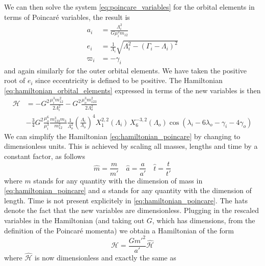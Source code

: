 \documentclass[ twoside,openright,titlepage,numbers=noenddot,headinclude,%
                footinclude=true,cleardoublepage=empty,abstractoff, %
                BCOR=5mm,paper=a4,fontsize=11pt,%
                american,%
                ]{scrreprt}
\begin{document}
We can then solve the system 
\ref{eq:poincare_variables} for the orbital elements in terms of Poincaré
variables, the result is
\begin{equation}
    \begin{aligned}
        a_i&= \frac{\Lambda_i^2}{G\mu_i^2m_{12}} \\
        e_i &= \frac{1}{\Lambda_i} \sqrt{\Lambda_i^2-(\Gamma_i-\Lambda_i)^2}\\
        \varpi_i&=-\gamma_i
    \end{aligned}
    \label{eq:orbital_elems_in_terms_of_poincare}
\end{equation}
and again similarly for the outer orbital elements. We have taken the positive root
of $e_i$ since eccentricity is defined to be positive. The Hamiltonian
\ref{eq:hamiltonian_orbital_elements} expressed in terms of the new variables
is then
\begin{equation}
    \begin{aligned}
        \mathcal{H}&=-G^2 \frac{\mu_i^3m_{12}^2}{2\Lambda_i^2}  
        -G^2 \frac{\mu_o^3m_{123}^2}{2\Lambda_o^2}\\ 
        &-\frac{3}{4}G^2 \frac{\mu_o^6}{\mu_i^3} \frac{m_{123}^3m_3}{m_{12}^2}
        \frac{1}{\Lambda_o^2} \left(\frac{\Lambda_i}{\Lambda_o}\right)^4
    X^{2,2}_1(\Lambda_i)\,X^{-3,2}_6(\Lambda_o)\cos(\lambda_i-6\lambda_o
    -\gamma_i - 4\gamma_o)
    \end{aligned}
    \label{eq:hamiltonian_poincare}
\end{equation}
We can simplify the Hamiltonian \ref{eq:hamiltonian_poincare} by changing
to dimensionless units. This is achieved by scaling all masses, lengths and
time by a constant factor, as follows
\begin{equation}
    \hat m= \frac{m}{m'} \quad\hat a= \frac{a}{a'}\quad \hat t = \frac{t}{t'}  
\end{equation}
where $m$ stands for any quantity with the dimension of mass in 
\cref{eq:hamiltonian_poincare} and $a$ stands for any quantity with the 
dimension of length. Time is not present explicitely in \cref{eq:hamiltonian_poincare}.
The hats denote the fact that the new variables are dimensionless. Plugging in the
rescaled variables in the Hamiltonian (and taking out $G$, which has dimensions, from
the definition of the Poincaré momenta) we obtain a Hamiltonian of the form
\begin{equation}
    \mathcal{H}= \frac{Gm'^2}{a'} \mathcal{\hat H}
\end{equation}
where $\mathcal{\hat H}$ is now dimensionless and exactly the same as
\end{document}
